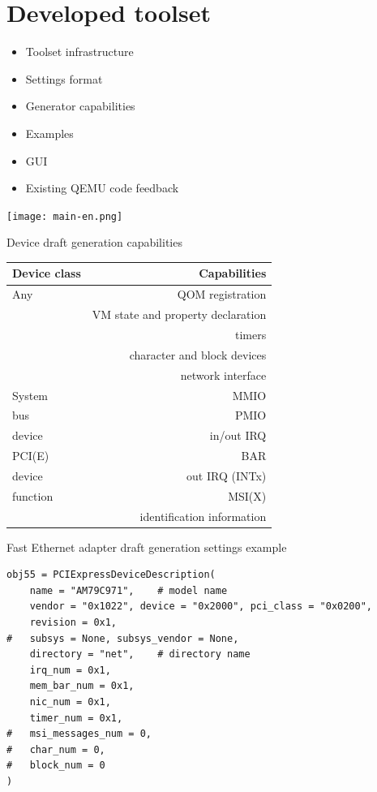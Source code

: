 \documentclass[unicode,hyperref={unicode=true},aspectratio=169]{beamer}
\newcommand*{\sectionpagekb}{\usebeamertemplate*{section page kb}}
\begin{document}
\section{Developed toolset}
\begin{frame}{}
\sectionpagekb
\begin{itemize}
\item Toolset infrastructure
\item Settings format
\item Generator capabilities
\item Examples
\item GUI
\item Existing QEMU code feedback
\end{itemize}
\end{frame}{}



\begin{frame}{}
\begin{center}
\texttt{[image: main-en.png]}
\end{center}
\end{frame}



\begin{frame}{Device draft generation capabilities}
\begin{center}
\begin{tabular}{l|r}
Device class & Capabilities \\
\hline
Any          & QOM registration \\
             & VM state and property declaration \\
             & timers \\
             & character and block devices \\
             & network interface \\
\hline
System       & MMIO \\
bus          & PMIO \\
device       & in/out IRQ \\
\hline
PCI(E)       & BAR \\
device       & out IRQ (INTx) \\
function     & MSI(X) \\
             & identification information
\end{tabular}
\end{center}
\end{frame}



\begin{frame}[fragile]{Fast Ethernet adapter draft generation settings example}
\lstset{language=Python}
\begin{lstlisting}
obj55 = PCIExpressDeviceDescription(
    name = "AM79C971",    # model name
    vendor = "0x1022", device = "0x2000", pci_class = "0x0200",
    revision = 0x1,
#   subsys = None, subsys_vendor = None,
    directory = "net",    # directory name
    irq_num = 0x1,
    mem_bar_num = 0x1,
    nic_num = 0x1,
    timer_num = 0x1,
#   msi_messages_num = 0,
#   char_num = 0,
#   block_num = 0
)
\end{lstlisting}
\end{frame}
\end{document}
